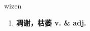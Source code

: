 
\begin{frame}
{\huge wizen}
\begin{center}
\begin{enumerate}\Large
  \item \textbf{凋谢，枯萎 v. \& adj.}
\end{enumerate}
\end{center}
\end{frame}
